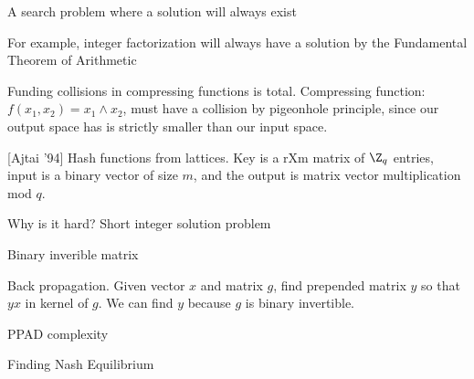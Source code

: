 \documentclass[twoside, 10pt]{article}
\begin{document}
\begin{defn}
   A search problem where a solution will always exist
\end{defn}
For example, integer factorization will always have a solution by the Fundamental Theorem of Arithmetic

Funding collisions in compressing functions is total. Compressing function: $f(x_1, x_2) = x_1 \land x_2$, must have a collision by pigeonhole principle, since our output space has is strictly smaller than our input space.

[Ajtai '94] Hash functions from lattices. Key is a rXm matrix of $\Z_q$ entries, input is a binary vector of size $m$, and the output is matrix vector multiplication mod $q$.

Why is it hard? Short integer solution problem %

Binary inverible matrix

Back propagation. Given vector $x$ and matrix $g$, find prepended matrix $y$ so that $yx$ in kernel of $g$. We can find $y$ because $g$ is binary invertible.

PPAD complexity

Finding Nash Equilibrium 
\end{document}
